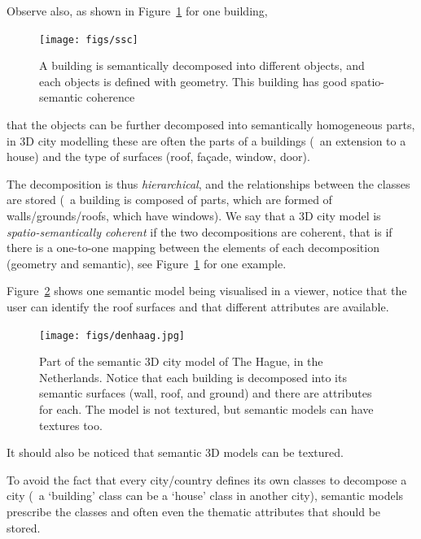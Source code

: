 %

Observe also, as shown in Figure~\ref{fig:ssc} for one building, 
\begin{figure}
  \centering
  \texttt{[image: figs/ssc]}
  \caption[A building is semantically decomposed into different objects]{A building is semantically decomposed into different objects, and each objects is defined with geometry. This building has good spatio-semantic coherence}%
\label{fig:ssc}
\end{figure}
that the objects can be further decomposed into semantically homogeneous parts, in 3D city modelling these are often the parts of a buildings (\eg\ an extension to a house) and the type of surfaces (roof, façade, window, door).

The decomposition is thus \emph{hierarchical}, 
and the relationships between the classes are stored (\eg\ a building is composed of parts, which are formed of walls/grounds/roofs, which have windows). 
We say that a 3D city model is \emph{spatio-semantically coherent} if the two decompositions are coherent,
that is if there is a one-to-one mapping between the elements of each decomposition (geometry and semantic), see Figure~\ref{fig:ssc} for one example.

%

Figure~\ref{fig:denhaag} shows one semantic model being visualised in a viewer, notice that the user can identify the roof surfaces and that different attributes are available.
\begin{figure}
  \centering
  \texttt{[image: figs/denhaag.jpg]}
  \caption[Part of the semantic 3D city model of The Hague]{Part of the semantic 3D city model of The Hague, in the Netherlands. Notice that each building is decomposed into its semantic surfaces (wall, roof, and ground) and there are attributes for each. The model is not textured, but semantic models can have textures too.}%
\label{fig:denhaag}
\end{figure}

%

It should also be noticed that semantic 3D models can be textured.

%

To avoid the fact that every city/country defines its own classes to decompose a city (\eg\ a `building' class can be a `house' class in another city), semantic models prescribe the classes and often even the thematic attributes that should be stored.


